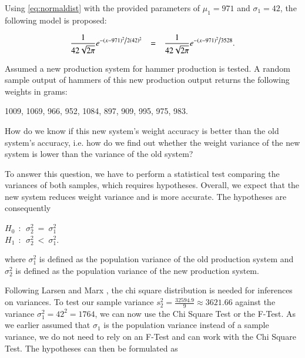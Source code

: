 Using \eqref{eq:normaldist} with the provided parameters of $\mu_1 = 971$ and $\sigma_1 = 42$, the following model is proposed: 

\begin{equation} \frac{1}{{42 \sqrt {2\pi } }}e^{{{ - \left( {x - 971 } \right)^2 } \mathord{\left/ {\vphantom {{ - \left( {x - 971 } \right)^2 } {2(42) ^2 }}} \right. \kern-\nulldelimiterspace}{2(42) ^2 }}} ~~~=~~~ \frac{1}{{42 \sqrt {2\pi } }}e^{{{ - \left( {x - 971 } \right)^2 } \mathord{\left/ {\vphantom {{ - \left( {x - 971 } \right)^2 } {7056 }}} \right. \kern-\nulldelimiterspace}{3528 }}}.
\label{eq:normaldistadapted}
\end{equation}



Assumed a new production system for hammer production is tested. A random sample output of hammers of this new production output returns the following weights in grams: \\

\begin{center}
    1009, 1069, 966, 952, 1084, 897, 909, 995, 975, 983.
\end{center}

How do we know if this new system's weight accuracy is better than the old system's accuracy, i.e. how do we find out whether the weight variance of the new system is lower than the variance of the old system?

To answer this question, we have to perform a statistical test comparing the variances of both samples, which requires hypotheses. Overall, we expect that the new system reduces weight variance and is more accurate. The hypotheses are consequently 

\begin{center}
$H_0~~:~~ \sigma^2_2~=~\sigma^2_1$\\ 
$H_1~~:~~ \sigma^2_2~<~\sigma^2_1$.
\end{center}

where $\sigma^2_1$ is defined as the population variance of the old production system and $\sigma^2_2$ is defined as the population variance of the new production system.

Following Larsen and Marx \cite[Chapter 7.5]{larsen2005introduction}, the chi square distribution is needed for inferences on variances. To test our sample variance $s_2^2 = \frac{32594.9}{9} \approx 3621.66 $ against the variance $\sigma^2_1 = 42^2 = 1764$, we can now use the Chi Square Test or the F-Test. As we earlier assumed that $\sigma_1$ is the population variance instead of a sample variance, we do not need to rely on an F-Test and can work with the Chi Square Test. The hypotheses can then be formulated as 

